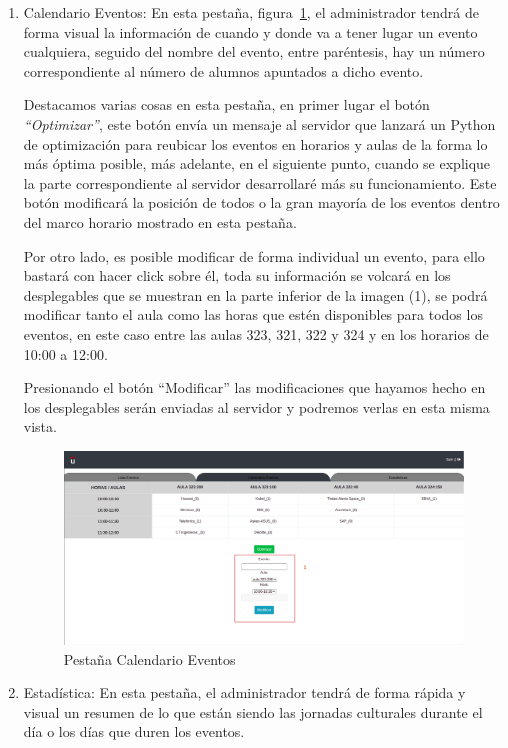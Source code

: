 \documentclass[a4paper, 12pt]{book}
\begin{document}
\begin{enumerate}
	\item Calendario Eventos: En esta pestaña, figura~\ref{fig:adminCalendario}, el administrador tendrá de forma visual la información de cuando y donde va a tener lugar un evento cualquiera, seguido del nombre del evento, entre paréntesis, hay un número correspondiente al número de alumnos apuntados a dicho evento.
	
	Destacamos varias cosas en esta pestaña, en primer lugar el botón \textit{``Optimizar''}, este botón envía un mensaje al servidor que lanzará un Python de optimización para reubicar los eventos en horarios y aulas de la forma lo más óptima posible, más adelante, en el siguiente punto, cuando se explique la parte correspondiente al servidor desarrollaré más su funcionamiento. Este botón modificará la posición de todos o la gran mayoría de los eventos dentro del marco horario mostrado en esta pestaña.
	
	Por otro lado, es posible modificar de forma individual un evento, para ello bastará con hacer click sobre él, toda su información se volcará en los desplegables que se muestran en la parte inferior de la imagen (1), se podrá modificar tanto el aula como las horas que estén disponibles para todos los eventos, en este caso entre las aulas 323, 321, 322 y 324 y en los horarios de 10:00 a 12:00. 
	
	Presionando el botón ``Modificar'' las modificaciones que hayamos hecho en los desplegables serán enviadas al servidor y podremos verlas en esta misma vista.
	
	\begin{figure}[h!]
  	\centering
  	\includegraphics[width=16cm, keepaspectratio]{img/adminCalendario.png}
  	\caption{Pestaña Calendario Eventos}\label{fig:adminCalendario}
	\end{figure}
	

\item Estadística: En esta pestaña, el administrador tendrá de forma rápida y visual un resumen de lo que están siendo las jornadas culturales durante el día o los días que duren los eventos.


\end{enumerate}
\end{document}
